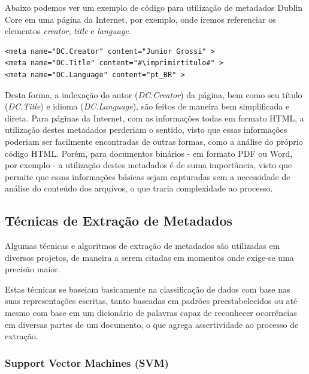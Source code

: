 \begin{textonovo}
Abaixo podemos ver um exemplo de código para utilização de metadados Dublin Core em uma página da Internet, por exemplo, onde iremos referenciar os elementos \textit{creator}, \textit{title} e \textit{language}.

\lstset{language=HTML}
\begin{lstlisting}[escapechar=\#]
<meta name="DC.Creator" content="Junior Grossi" >
<meta name="DC.Title" content="#\imprimirtitulo#" >
<meta name="DC.Language" content="pt_BR" >
\end{lstlisting}

Desta forma, a indexação do autor (\textit{DC.Creator}) da página, bem como seu título (\textit{DC.Title}) e idioma (\textit{DC.Language}), são feitos de maneira bem simplificada e direta. Para páginas da Internet, com as informações todas em formato HTML, a utilização destes metadados perderiam o sentido, visto que essas informações poderiam ser facilmente encontradas de outras formas, como a análise do próprio código HTML. Porém, para documentos binários - em formato PDF ou Word, por exemplo - a utilização destes metadados é de suma importância, visto que permite que essas informações básicas sejam capturadas sem a necessidade de análise do conteúdo dos arquivos, o que traria complexidade ao processo.

\end{textonovo}

\subsection{Técnicas de Extração de Metadados}

Algumas técnicas e algoritmos de extração de metadados são utilizadas em diversos projetos, de maneira a serem citadas em momentos onde exige-se uma precisão maior.

Estas técnicas se baseiam basicamente na classificação de dados com base nas suas representações escritas, tanto baseadas em padrões preestabelecidos ou até mesmo com base em um dicionário de palavras capaz de reconhecer ocorrências em diversas partes de um documento, o que agrega assertividade ao processo de extração.

\subsubsection{Support Vector Machines (SVM)}
\label{tecnica-svm}

